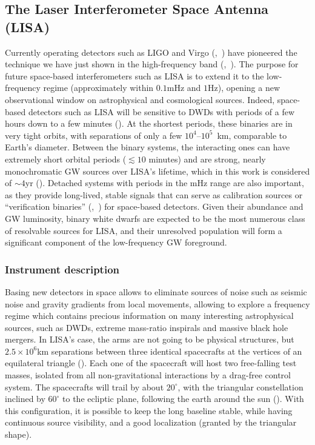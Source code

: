 \subsection{{The} Laser Interferometer Space Antenna ({LISA})}
{Currently operating} detectors such as LIGO and Virgo ({\cite{PhysRevLett.116.061102},~\cite{Abbott_2019}}) have pioneered the technique we have just shown in the high-frequency band ({\cite{LISA_ref},~\cite{Virgo_cit}}).
The purpose for future space-based interferometers such as LISA is to extend it to the low-frequency regime ({approximately} within $0.1$mHz and $1$Hz), opening a new observational window on astrophysical and cosmological sources.
Indeed, space-based detectors such as LISA will be sensitive to DWDs with periods of a few hours down to a few minutes ({\cite{baker2019laserinterferometerspaceantenna}}). 
At the shortest periods, these binaries are in very tight orbits, with separations of only a few $10^{4}$–$10^{5}$~km, comparable to Earth's diameter.
Between the binary systems, the interacting ones can have extremely short orbital periods ($\lesssim 10$ minutes) and are strong, nearly monochromatic GW sources over LISA's lifetime, which in this work is considered of $\sim4$yr ({\cite{baker2019laserinterferometerspaceantenna}}).  
Detached systems with periods in the mHz range are also important, as they provide long-lived, stable signals that can serve as calibration sources or ``verification binaries'' {(\cite{kupfer_2018},~\cite{Kupfer_2024})} for space-based detectors.
Given their abundance and GW luminosity, binary white dwarfs are expected to be the most numerous class of resolvable sources for LISA, and their unresolved population will form a significant component of the low-frequency GW foreground.

\subsubsection{Instrument description}
Basing new detectors in space allows to eliminate sources of noise such as seismic noise and gravity gradients from local movements, allowing to explore a frequency regime which contains precious information on many interesting astrophysical sources, such as DWDs, extreme mass-ratio inspirals and massive black hole mergers.
In LISA's case, the arms are not going to be physical structures, but $2.5\times10^6$km separations between three identical spacecrafts at the vertices of an equilateral triangle ({\cite{baker2019laserinterferometerspaceantenna}}).
Each one of the spacecraft will host two free-falling test masses, isolated from all non-gravitational interactions by a drag-free control system.
The spacecrafts will trail by about $20^{\circ}$, with the triangular constellation inclined by $60^{\circ}$ to the ecliptic plane, following the earth around the sun ({\cite{baker2019laserinterferometerspaceantenna}}).
With this configuration, it is possible to keep the long baseline stable, while having continuous source visibility, and a good localization (granted by the triangular shape).

